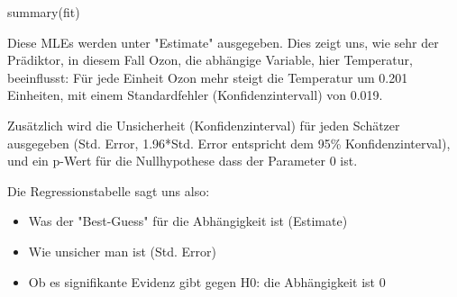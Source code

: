 \documentclass[a4paper,twoside]{tufte-book}\usepackage[]{graphicx}\usepackage[]{color}
\begin{document}
\begin{Schunk}
\begin{Sinput}
summary(fit)
\end{Sinput}
\end{Schunk}

Diese MLEs werden unter "Estimate" ausgegeben. Dies zeigt uns, wie sehr der Prädiktor, in diesem Fall Ozon, die abhängige Variable, hier Temperatur, beeinflusst: Für jede Einheit Ozon mehr steigt die Temperatur um 0.201 Einheiten, mit einem Standardfehler (Konfidenzintervall) von 0.019. 

Zusätzlich wird die Unsicherheit (Konfidenzinterval) für jeden Schätzer ausgegeben (Std. Error, 1.96*Std. Error entspricht dem 95\% Konfidenzinterval), und ein p-Wert für die Nullhypothese dass der Parameter 0 ist.  %

Die Regressionstabelle sagt uns also: 

\begin{itemize}
\item Was der "Best-Guess" für die Abhängigkeit ist (Estimate)
\item Wie unsicher man ist (Std. Error)
\item Ob es signifikante Evidenz gibt gegen H0: die Abhängigkeit ist 0 
\end{itemize}
\end{document}

